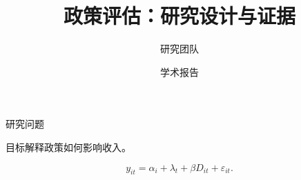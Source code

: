 \documentclass[aspectratio=169]{beamer}
\title{政策评估：研究设计与证据}
\author{研究团队}
\date{学术报告}
\begin{document}
\begin{frame}\titlepage\end{frame}
\begin{frame}{研究问题}
\begin{block}{目标}解释政策如何影响收入。\end{block}
\[y_{it}=\alpha_i+\lambda_t+\beta D_{it}+\varepsilon_{it}.\]
\end{frame}
\end{document}
